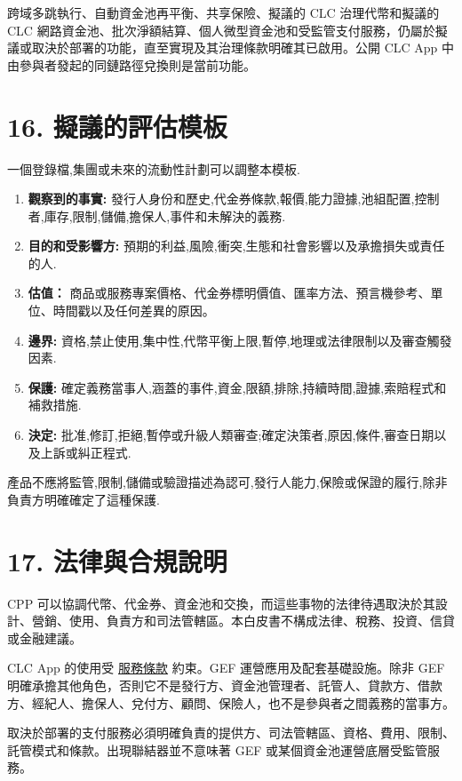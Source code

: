 \documentclass[11pt]{article}
\begin{document}
跨域多跳執行、自動資金池再平衡、共享保險、擬議的 CLC 治理代幣和擬議的 CLC 網路資金池、批次淨額結算、個人微型資金池和受監管支付服務，仍屬於擬議或取決於部署的功能，直至實現及其治理條款明確其已啟用。公開 CLC App 中由參與者發起的同鏈路徑兌換則是當前功能。


\section*{16. 擬議的評估模板}

一個登錄檔,集團或未來的流動性計劃可以調整本模板.

\begin{enumerate}[leftmargin=*]
\item \textbf{觀察到的事實:} 發行人身份和歷史,代金券條款,報價,能力證據,池組配置,控制者,庫存,限制,儲備,擔保人,事件和未解決的義務.
\item \textbf{目的和受影響方:} 預期的利益,風險,衝突,生態和社會影響以及承擔損失或責任的人.
\item \textbf{估值：} 商品或服務專案價格、代金券標明價值、匯率方法、預言機參考、單位、時間戳以及任何差異的原因。
\item \textbf{邊界:} 資格,禁止使用,集中性,代幣平衡上限,暫停,地理或法律限制以及審查觸發因素.
\item \textbf{保護:} 確定義務當事人,涵蓋的事件,資金,限額,排除,持續時間,證據,索賠程式和補救措施.
\item \textbf{決定:} 批准,修訂,拒絕,暫停或升級人類審查;確定決策者,原因,條件,審查日期以及上訴或糾正程式.
\end{enumerate}
產品不應將監管,限制,儲備或驗證描述為認可,發行人能力,保險或保證的履行,除非負責方明確確定了這種保護.


\section*{17. 法律與合規說明}

CPP 可以協調代幣、代金券、資金池和交換，而這些事物的法律待遇取決於其設計、營銷、使用、負責方和司法管轄區。本白皮書不構成法律、稅務、投資、信貸或金融建議。

CLC App 的使用受 \href{https://docs.cosmolocal.credit/zh-Hant/governance/terms}{服務條款} 約束。GEF 運營應用及配套基礎設施。除非 GEF 明確承擔其他角色，否則它不是發行方、資金池管理者、託管人、貸款方、借款方、經紀人、擔保人、兌付方、顧問、保險人，也不是參與者之間義務的當事方。

取決於部署的支付服務必須明確負責的提供方、司法管轄區、資格、費用、限制、託管模式和條款。出現聯結器並不意味著 GEF 或某個資金池運營底層受監管服務。
\end{document}
